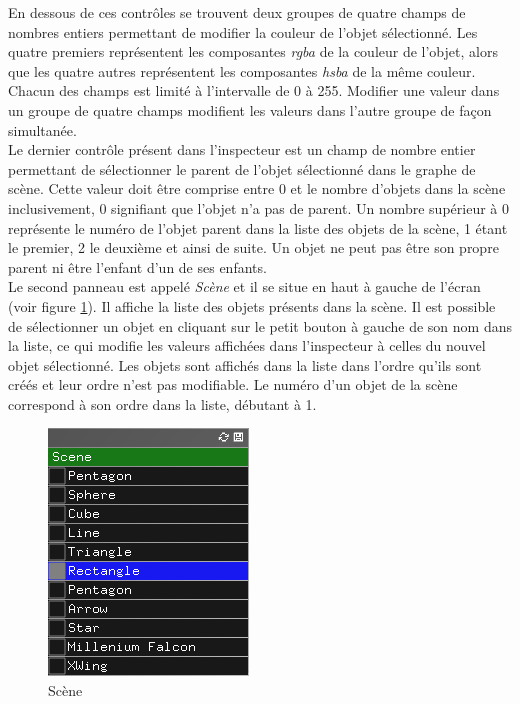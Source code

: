 En dessous de ces contrôles se trouvent deux groupes de quatre champs de nombres entiers permettant de modifier la couleur de l'objet sélectionné.
Les quatre premiers représentent les composantes \emph{rgba} de la couleur de l'objet, alors que les quatre autres représentent les composantes \emph{hsba} de la même couleur. Chacun des champs est limité à l'intervalle de 0 à 255. Modifier une valeur dans un groupe de quatre champs modifient les valeurs dans l'autre groupe de façon simultanée.\\

Le dernier contrôle présent dans l'inspecteur est un champ de nombre entier permettant de sélectionner le parent de l'objet sélectionné dans le graphe de scène.
Cette valeur doit être comprise entre 0 et le nombre d'objets dans la scène inclusivement, 0 signifiant que l'objet n'a pas de parent.
Un nombre supérieur à 0 représente le numéro de l'objet parent dans la liste des objets de la scène, 1 étant le premier, 2 le deuxième et ainsi de suite.
Un objet ne peut pas être son propre parent ni être l'enfant d'un de ses enfants.\\

Le second panneau est appelé \emph{Scène} et il se situe en haut à gauche de l'écran (voir figure \ref{fig:scene}).
Il affiche la liste des objets présents dans la scène.
Il est possible de sélectionner un objet en cliquant sur le petit bouton à gauche de son nom dans la liste, ce qui modifie les valeurs affichées dans l'inspecteur à celles du nouvel objet sélectionné.
Les objets sont affichés dans la liste dans l'ordre qu'ils sont créés et leur ordre n'est pas modifiable.
Le numéro d'un objet de la scène correspond à son ordre dans la liste, débutant à 1.\\

\begin{figure}[H]
    \centering
	\includegraphics[scale=0.6]{fig/scene.png}
	\caption{Scène}
	\label{fig:scene}
\end{figure}

